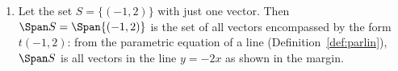 \begin{example} \label{eg:span}
\begin{enumerate}
\item Let the set \(S=\{(-1,2)\}\) with just one vector.  
%
Then \(\Span S=\Span\{(-1,2)\}\) is the set of all vectors encompassed by the form \(t(-1,2)\): from the parametric equation of a line (Definition~\ref{def:parlin}), \(\Span S\) is all vectors in the line \(y=-2x\) as shown in the margin.


\end{enumerate}
\end{example}
